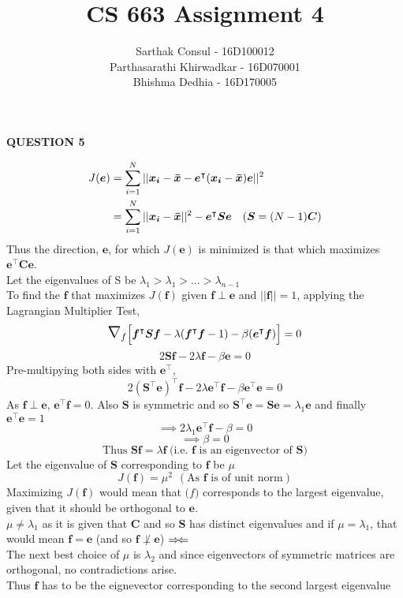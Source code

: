 \documentclass{article}
\title{CS 663 Assignment 4}
\author{Sarthak Consul - 16D100012\\
Parthasarathi Khirwadkar - 16D070001\\
Bhishma Dedhia - 16D170005}
\date{}
\begin{document}
\maketitle

\centerline{\textbf{\large\large{{{QUESTION 5}}}}}

\begin{align*}
\centering
    J(\bm{e}) &= \sum_{i=1}^N ||\bm{x_i} -\bm{\bar{x}}-\bm{e}^\intercal (\bm{x_i} -\bm{\bar{x}})\bm{e}||^2\\
    &= \sum_{i=1}^N ||\bm{x_i} -\bm{\bar{x}}||^2 - \bm{e}^\intercal\bm{S}\bm{e} \hspace{10pt}(\bm{S} = (N-1)\bm{C})
\end{align*}
Thus the direction, $\bm{e}$,  for which $J(\bm{e})$ is minimized is that which maximizes $\bm{e}^\intercal\bm{C}\bm{e}$.\\
Let the eigenvalues of S be $\lambda_1 > \lambda_1 > \dots > \lambda_{n-1}$\\
To find the $\bm{f}$ that maximizes $J(\bm{f})$ given $\bm{f} \perp \bm{e}$ and $||\bm{f}|| = 1$, applying the Lagrangian Multiplier Test,\\
\[
\mathlarger{\mathlarger{\nabla}}_{f}\Big[ \bm{f}^\intercal\bm{Sf} - \lambda (\bm{f}^\intercal\bm{f} - 1) -\beta (\bm{e}^\intercal\bm{f}) \Big] = 0 \]
\[ 2\bm{S}\bm{f} - 2\lambda\bm{f} - \beta\bm{e} = 0\]
Pre-multipying both sides with $\bm{e}^\intercal$,
\[ 2(\bm{S}^\intercal\bm{e})^\intercal\bm{f} - 2\lambda\bm{e}^\intercal\bm{f} - \beta\bm{e}^\intercal\bm{e} = 0\]
As $\bm{f} \perp \bm{e}$, $\bm{e}^\intercal\bm{f} = 0$. Also $\bm{S}$ is symmetric and so $\bm{S}^\intercal\bm{e} = \bm{S}\bm{e} = \lambda_1\bm{e}$ and finally  $\bm{e}^\intercal\bm{e} = 1$
\[\implies 2\lambda_1\bm{e}^\intercal\bm{f} - \beta = 0\]
\[\implies \beta = 0\]
\[\text{Thus }\bm{Sf} = \lambda \bm{f} \hspace{3pt} \big(\text{i.e. }\bm{f} \text{ is an eigenvector of }\bm{S} \big)\]
Let the eigenvalue of $\bm{S}$ corresponding to $\bm{f}$ be $\mu$
\[J(\bm{f}) = \mu^2 \hspace{5pt}(\text{As }\bm{f}\text{ is of unit norm})\]
Maximizing $J(\bm{f})$ would mean that $\bm(f)$ corresponds to the largest eigenvalue, given that it should be orthogonal to $\bm{e}$.\\
$\mu \neq \lambda_1$ as it is given that $\bm{C}$ and so $\bm{S}$ has distinct eigenvalues and if $\mu = \lambda_1$, that would mean $\bm{f} = \bm{e}$ (and so $\bm{f} \not\perp \bm{e}$) $\Rightarrow\mskip-\thinmuskip\Leftarrow$\\
The next best choice of $\mu$ is $\lambda_2$ and since eigenvectors of symmetric matrices are orthogonal, no contradictions arise.\\
Thus $\bm{f}$ has to be the eignevector corresponding to the second largest eigenvalue 
\end{document}
